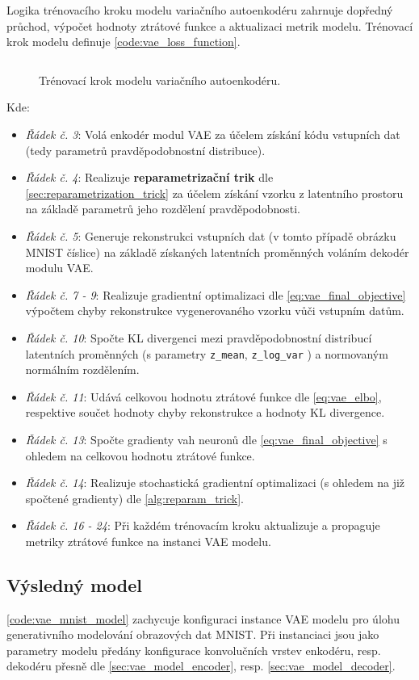 Logika trénovacího kroku modelu variačního autoenkodéru zahrnuje dopředný průchod, výpočet hodnoty ztrátové funkce a aktualizaci metrik modelu.
Trénovací krok modelu definuje \autoref{code:vae_loss_function}.

\newpage
\begin{figure}[H]
    \inputminted[linenos]{python}{code_snippets/vae_loss_function.py}
    \caption{Trénovací krok modelu variačního autoenkodéru.}
    \label{code:vae_loss_function}
\end{figure}


Kde:
\begin{itemize}
    \item \emph{Řádek č. 3}: Volá enkodér modul VAE za účelem získání kódu vstupních dat (tedy parametrů pravděpodobnostní distribuce).
    \item \emph{Řádek č. 4}: Realizuje \textbf{reparametrizační trik} dle \autoref{sec:reparametrization_trick} za účelem získání vzorku z latentního prostoru na základě parametrů jeho rozdělení pravděpodobnosti.
    \item \emph{Řádek č. 5}: Generuje rekonstrukci vstupních dat (v tomto případě obrázku MNIST číslice) na základě získaných latentních proměnných voláním dekodér modulu VAE.
    \item \emph{Řádek č. 7 - 9}: Realizuje gradientní optimalizaci dle \autoref{eq:vae_final_objective} výpočtem chyby rekonstrukce vygenerovaného vzorku vůči vstupním datům.
    \item \emph{Řádek č. 10}: Spočte KL divergenci mezi pravděpodobnostní distribucí latentních proměnných (s parametry \lstinline{z_mean}, \lstinline{z_log_var} ) a normovaným normálním rozdělením.
    \item \emph{Řádek č. 11}: Udává celkovou hodnotu ztrátové funkce dle \autoref{eq:vae_elbo}, respektive součet hodnoty chyby rekonstrukce a hodnoty KL divergence.
    \item \emph{Řádek č. 13}: Spočte gradienty vah neuronů dle \autoref{eq:vae_final_objective} s ohledem na celkovou hodnotu ztrátové funkce.
    \item \emph{Řádek č. 14}: Realizuje stochastická gradientní optimalizaci (s ohledem na již spočtené gradienty) dle \autoref{alg:reparam_trick}.
    \item \emph{Řádek č. 16 - 24}: Při každém trénovacím kroku aktualizuje a propaguje metriky ztrátové funkce na instanci VAE modelu.
\end{itemize}

\subsection{Výsledný model}
\label{sec:vae_prepared_model}
\autoref{code:vae_mnist_model} zachycuje konfiguraci instance VAE modelu pro úlohu generativního modelování obrazových dat MNIST.
Při instanciaci jsou jako parametry modelu předány konfigurace konvolučních vrstev enkodéru, resp. dekodéru přesně dle \autoref{sec:vae_model_encoder}, resp. \autoref{sec:vae_model_decoder}.

